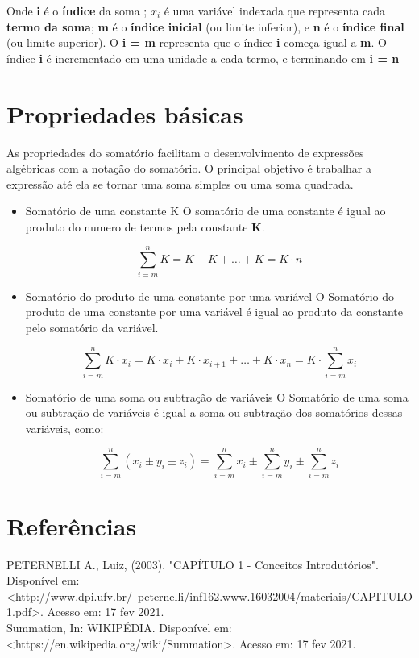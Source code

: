 \documentclass[a4paper, 12pt, fleqn, leqno]{article}
\begin{document}
		Onde {\bf i} é o {\bf índice} da soma ; {\bf ${ x_{i}}$} é uma variável indexada que representa cada {\bf termo da soma}; {\bf m} é o {\bf índice inicial} (ou limite inferior), e {\bf n} é o {\bf índice final} (ou limite superior). O {\bf i = m} representa que o índice {\bf i} começa igual a {\bf m}. O índice {\bf i} é incrementado em uma unidade a cada termo, e terminando em {\bf i = n}
		
	\section{Propriedades básicas}
		As propriedades do somatório facilitam o desenvolvimento de expressões algébricas com a notação do somatório. O principal objetivo é trabalhar a expressão até ela se tornar uma soma simples ou uma soma quadrada.
		\begin{itemize}
			\item Somatório de uma constante K
			O somatório de uma constante é igual ao produto do numero de termos pela constante {\bf K}.
			\begin{flushleft}
				$$ \sum_{i = m}^{n} K = K + K + \ldots + K = K \cdot n$$
			\end{flushleft}
			\item Somatório do produto de uma constante por uma variável
			O Somatório do produto de uma constante por uma variável é igual ao produto da constante pelo somatório da variável.
			\begin{flushleft}
				$$ \sum_{i = m}^{n} K \cdot x_{i} = K \cdot x_{i} + K \cdot x_{i + 1} + \ldots + K \cdot x_{n} = K \cdot \sum_{i = m}^{n} x_{i}$$
			\end{flushleft}
			\item Somatório de uma soma ou subtração de variáveis
			O Somatório de uma soma ou subtração de variáveis é igual a soma ou subtração dos somatórios dessas variáveis, como:
			\begin{flushleft}
				$$ \sum_{i = m}^{n} (x_{i} \pm y_{i} \pm z_{i}) = \sum_{i = m}^{n} x_{i} \pm \sum_{i = m}^{n} y_{i} \pm \sum_{i = m}^{n} z_{i}$$
			\end{flushleft}
		\end{itemize}
		
	\section{Referências}
	
	PETERNELLI A., Luiz, (2003). "CAPÍTULO 1 - Conceitos Introdutórios". Disponível em: <http://www.dpi.ufv.br/~peternelli/inf162.www.16032004/materiais/CAPITULO1.pdf>. Acesso em: 17 fev 2021.\\
	
	Summation, In: WIKIPÉDIA. Disponível em: <https://en.wikipedia.org/wiki/Summation>. Acesso em: 17 fev 2021.
	
\end{document}
